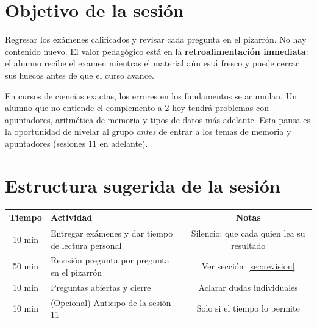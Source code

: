 \documentclass[12pt, oneside]{article}
\begin{document}

\tableofcontents
\newpage

\section{Objetivo de la sesión}

Regresar los exámenes calificados y revisar cada pregunta en el pizarrón.
No hay contenido nuevo.  El valor pedagógico está en la
\textbf{retroalimentación inmediata}: el alumno recibe el examen mientras
el material aún está fresco y puede cerrar sus huecos antes de que el curso
avance.

\begin{notaprofesor}
  En cursos de ciencias exactas, los errores en los fundamentos se acumulan.
  Un alumno que no entiende el complemento a 2 hoy tendrá problemas con
  apuntadores, aritmética de memoria y tipos de datos más adelante.
  Esta pausa es la oportunidad de nivelar al grupo \textit{antes} de entrar
  a los temas de memoria y apuntadores (sesiones 11 en adelante).
\end{notaprofesor}

\section{Estructura sugerida de la sesión}

\begin{center}
\begin{tabular}{clc}
  \toprule
  \textbf{Tiempo} & \textbf{Actividad} & \textbf{Notas} \\
  \midrule
  10 min & Entregar exámenes y dar tiempo de lectura personal
         & Silencio; que cada quien lea su resultado \\
  50 min & Revisión pregunta por pregunta en el pizarrón
         & Ver sección~\ref{sec:revision} \\
  10 min & Preguntas abiertas y cierre
         & Aclarar dudas individuales \\
  \midrule
  10 min & (Opcional) Anticipo de la sesión 11
         & Solo si el tiempo lo permite \\
  \bottomrule
\end{tabular}
\end{center}
\end{document}

